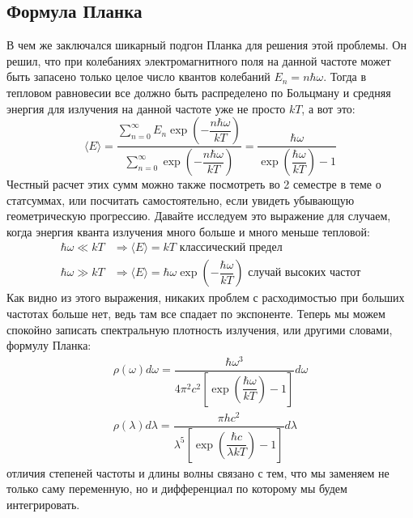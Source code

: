\documentclass[12pt]{article}
\begin{document}
\subsection{Формула Планка}
В чем же заключался шикарный подгон Планка для решения этой проблемы. Он решил, что при колебаниях электромагнитного поля на данной частоте может быть запасено только целое число квантов колебаний $E_n =n \hbar \omega$. Тогда в тепловом равновесии все должно быть распределено по Больцману и средняя энергия для излучения на данной частоте уже не просто $kT$, а вот это:
\begin{equation*}
    \langle E \rangle = \dfrac{\sum\limits_{n=0}^{\infty} E_n \exp{\left(-\dfrac{n\hbar \omega}{kT}\right)}}{\sum\limits_{n=0}^{\infty} \exp{\left(-\dfrac{n\hbar \omega}{kT}\right)}} = \dfrac{\hbar \omega}{\exp{\left(\dfrac{\hbar \omega}{kT}\right)} - 1}
\end{equation*}
Честный расчет этих сумм можно также посмотреть во 2 семестре в теме о статсуммах, или посчитать самостоятельно, если увидеть убывающую геометрическую прогрессию. Давайте исследуем это выражение для случаем, когда энергия кванта излучения много больше и много меньше тепловой:
\begin{align*}
    \hbar \omega \ll kT &\Rightarrow \langle E \rangle = kT \text{ классический предел} \\
    \hbar \omega \gg kT &\Rightarrow \langle E \rangle = \hbar \omega  \exp{\left(-\dfrac{\hbar \omega}{kT}\right)} \text{ случай высоких частот}
\end{align*}
Как видно из этого выражения, никаких проблем с расходимостью при больших частотах больше нет, ведь там все спадает по экспоненте. Теперь мы можем спокойно записать спектральную плотность излучения, или другими словами, формулу Планка:
\begin{gather}
\label{eq:sem_01_plank}
    \rho(\omega)d\omega = \dfrac{\hbar \omega^3}{4\pi^2c^2\left[ \exp{\left(\dfrac{\hbar \omega}{kT}\right)} - 1\right]}d\omega\\
    \rho(\lambda) d\lambda = \dfrac{\pi h c^2}{\lambda^5\left[ \exp{\left(\dfrac{\hbar c}{\lambda kT}\right)} - 1\right]}d\lambda
\end{gather}
отличия степеней частоты и длины волны связано с тем, что мы заменяем не только саму переменную, но и дифференциал по которому мы будем интегрировать.
\end{document}
